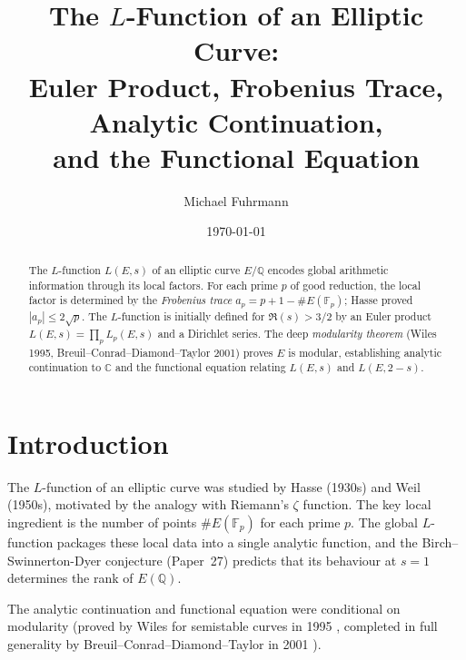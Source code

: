 \documentclass[12pt,a4paper]{amsart}
\theoremstyle{definition}
\newcommand{\Q}{\mathbb{Q}}
\newcommand{\C}{\mathbb{C}}
\newcommand{\Fp}{\mathbb{F}_p}
\begin{document}

\title{The \texorpdfstring{$L$}{L}-Function of an Elliptic Curve:\\
       Euler Product, Frobenius Trace, Analytic Continuation,\\
       and the Functional Equation}

\author{Michael Fuhrmann}
\address{Specialist Mathematics Project, Build 84}
\date{\today}

\begin{abstract}
The $L$-function $L(E,s)$ of an elliptic curve $E/\Q$ encodes global
arithmetic information through its local factors.
For each prime $p$ of good reduction, the local factor is determined by
the \emph{Frobenius trace} $a_p = p + 1 - \#E(\Fp)$;
Hasse proved $|a_p| \le 2\sqrt{p}$.
The $L$-function is initially defined for $\Re(s) > 3/2$ by an Euler product
$L(E,s) = \prod_p L_p(E,s)$ and a Dirichlet series.
The deep \emph{modularity theorem} (Wiles 1995, Breuil--Conrad--Diamond--Taylor 2001)
proves $E$ is modular, establishing analytic continuation to $\C$
and the functional equation relating $L(E,s)$ and $L(E,2-s)$.
\end{abstract}

\maketitle
\tableofcontents

\section{Introduction}

The $L$-function of an elliptic curve was studied by Hasse (1930s) and
Weil (1950s), motivated by the analogy with Riemann's $\zeta$ function.
The key local ingredient is the number of points $\#E(\Fp)$ for each prime $p$.
The global $L$-function packages these local data into a single analytic function,
and the Birch--Swinnerton-Dyer conjecture (Paper~27) predicts that its
behaviour at $s = 1$ determines the rank of $E(\Q)$.

The analytic continuation and functional equation were conditional on
modularity (proved by Wiles for semistable curves in 1995 \cite{Wiles1995},
completed in full generality by Breuil--Conrad--Diamond--Taylor in 2001
\cite{BCDT2001}).
\end{document}
